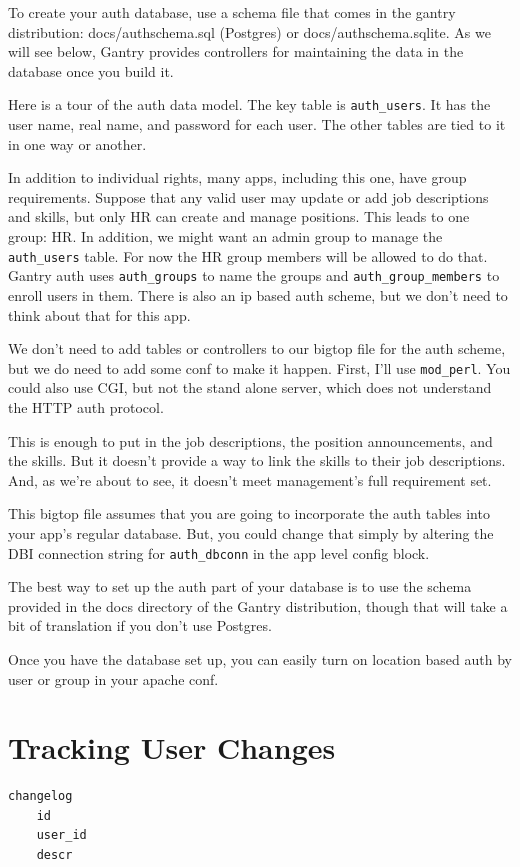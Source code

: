 To create your auth database, use a schema file that comes in the
gantry distribution: docs/authschema.sql (Postgres) or docs/authschema.sqlite.
As we will see below, Gantry provides controllers for maintaining the
data in the database once you build it.

Here is a tour of the auth data model.  The key table is \verb+auth_users+.
It has the user name, real name, and password for each user.  The other
tables are tied to it in one way or another.

In addition to individual rights, many apps, including this one, have group
requirements.  Suppose that any valid user may update or add job descriptions
and skills, but only HR can create and manage positions.  This leads to one
group: HR.  In addition, we might want an admin group to manage the
\verb+auth_users+ table.  For now the HR group members will be allowed to
do that.  Gantry auth uses \verb+auth_groups+ to name the groups and
\verb+auth_group_members+ to enroll users in them.  There is also an ip based
auth scheme, but we don't need to think about that for this app.

We don't need to add tables or controllers to our bigtop file for the
auth scheme, but we do need to add some conf to make it happen.  First,
I'll use \verb+mod_perl+.  You could also use CGI, but not the stand alone
server, which does not understand the HTTP auth protocol.





This is enough to put in the job descriptions, the position announcements,
and the skills.  But it doesn't provide a way to link the skills to their
job descriptions.  And, as we're about to see, it doesn't meet management's
full requirement set.

This bigtop file assumes that you are going to incorporate the auth tables
into your app's regular database.  But, you could change that simply by
altering the DBI connection string for \verb+auth_dbconn+ in the app level
config block.

The best way to set up the auth part of your database is to use the schema
provided in the docs directory of the Gantry distribution, though that will
take a bit of translation if you don't use Postgres.

Once you have the database set up, you can easily turn on location based
auth by user or group in your apache conf.

\section{Tracking User Changes}

\begin{verbatim}
changelog
    id
    user_id
    descr
\end{verbatim}

